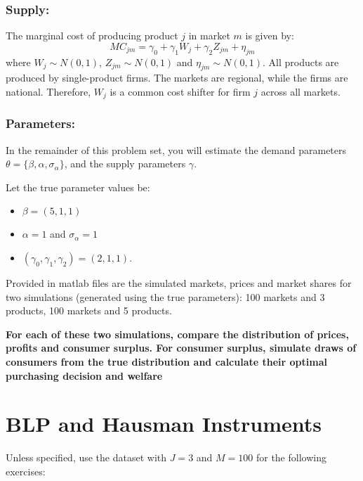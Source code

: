 \documentclass[12pt ]{article}
\begin{document}
\subsubsection{Supply:}
The marginal cost of producing product $j$ in market $m$ is given by:
\begin{equation}
MC_{jm}=\gamma_0+\gamma_1 W_{j}+\gamma_2Z_{jm} +\eta_{jm}
\end{equation}
where $W_j \sim N(0,1)$, $Z_{jm}\sim N(0,1)$ and $\eta_{jm} \sim
N(0,1)$. All products are produced by single-product firms. The
markets are regional, while the firms are national. Therefore, $W_j$
is a common cost shifter for firm $j$ across all markets.

\subsubsection{Parameters:}
In the remainder of this problem set, you will estimate the demand parameters $\theta=\{ \beta, \alpha, \sigma_{\alpha}\}$, and the supply parameters $\gamma$.

Let the true parameter values be:
\begin{itemize}
\item $\beta=(5,1,1)$
\item $\alpha=1$ and $\sigma_{\alpha}=1$
\item $(\gamma_0,\gamma_1, \gamma_2) = (2,1,1)$.
\end{itemize}

Provided in matlab files are the simulated markets, prices and market shares for two simulations (generated using the true parameters): 100 markets and 3 products, 100 markets and 5 products.

\textbf{For each of these two simulations, compare the distribution of prices, profits and consumer surplus.  For consumer surplus, simulate draws of consumers from the true distribution and calculate their optimal purchasing decision and welfare}

\section{BLP and Hausman Instruments}

Unless specified, use the dataset with $J=3$ and $M=100$ for the
following exercises:
\end{document}
